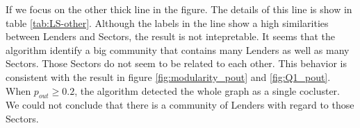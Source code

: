 \begin{table}[H]
	\centering
	\caption{A result in Lender-Sector community detection}
	\label{tab:LS-agriculture}
\end{table}

If we focus on the other thick line in the figure.
The details of this line is show in table \ref{tab:LS-other}.
Although the labels in the line show a high similarities between Lenders and Sectors,
the result is not intepretable.
It seems that the algorithm identify a big community that contains many Lenders as well as many Sectors.
Those Sectors do not seem to be related to each other.
This behavior is consistent with the result in figure \ref{fig:modularity_pout} and \ref{fig:Q1_pout}.
When $p_{out} \ge 0.2$, the algorithm detected the whole graph as a single cocluster.
We could not conclude that there is a community of Lenders with regard to those Sectors.

